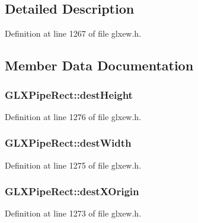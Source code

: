 \subsection{Detailed Description}


Definition at line 1267 of file glxew.\+h.



\subsection{Member Data Documentation}
\hypertarget{struct_g_l_x_pipe_rect_a858b0ea6642e451495aff35cfefbd083}{}
\subsubsection[{dest\+Height}]{ G\+L\+X\+Pipe\+Rect\+::dest\+Height}\label{struct_g_l_x_pipe_rect_a858b0ea6642e451495aff35cfefbd083}


Definition at line 1276 of file glxew.\+h.

\hypertarget{struct_g_l_x_pipe_rect_a3c07991d2a8fb6e973eae834650b3dad}{}
\subsubsection[{dest\+Width}]{ G\+L\+X\+Pipe\+Rect\+::dest\+Width}\label{struct_g_l_x_pipe_rect_a3c07991d2a8fb6e973eae834650b3dad}


Definition at line 1275 of file glxew.\+h.

\hypertarget{struct_g_l_x_pipe_rect_a8b7b941894ad3420326d7e9fa885bb71}{}
\subsubsection[{dest\+X\+Origin}]{ G\+L\+X\+Pipe\+Rect\+::dest\+X\+Origin}\label{struct_g_l_x_pipe_rect_a8b7b941894ad3420326d7e9fa885bb71}


Definition at line 1273 of file glxew.\+h.

